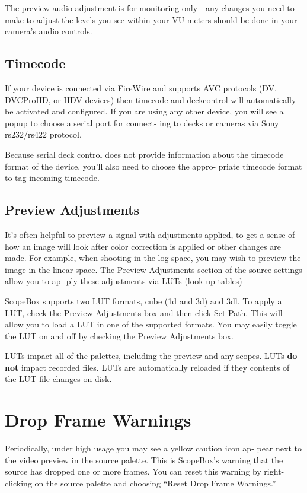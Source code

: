 \documentclass[10,letterpaper,]{report}
\begin{document}
The preview audio adjustment is for monitoring only - any changes you
need to make to adjust the levels you see within your VU meters should
be done in your camera's audio controls.

\subsection{Timecode}

If your device is connected via FireWire and supports AVC protocols (DV,
DVCProHD, or HDV devices) then timecode and deckcontrol will
automatically be activated and configured. If you are using any other
device, you will see a popup to choose a serial port for connect- ing to
decks or cameras via Sony rs232/rs422 protocol.

Because serial deck control does not provide information about the
timecode format of the device, you'll also need to choose the appro-
priate timecode format to tag incoming timecode.

\subsection{Preview Adjustments}

It's often helpful to preview a signal with adjustments applied, to get
a sense of how an image will look after color correction is applied or
other changes are made. For example, when shooting in the log space, you
may wish to preview the image in the linear space. The Preview
Adjustments section of the source settings allow you to ap- ply these
adjustments via LUTs (look up tables)

ScopeBox supports two LUT formats, cube (1d and 3d) and 3dl. To apply a
LUT, check the Preview Adjustments box and then click Set Path. This
will allow you to load a LUT in one of the supported formats. You may
easily toggle the LUT on and off by checking the Preview Adjustments
box.

LUTs impact all of the palettes, including the preview and any scopes.
LUTs \textbf{do not} impact recorded files. LUTs are automatically
reloaded if they contents of the LUT file changes on disk.

\section{Drop Frame Warnings}

Periodically, under high usage you may see a yellow caution icon ap-
pear next to the video preview in the source palette. This is ScopeBox's
warning that the source has dropped one or more frames. You can reset
this warning by right-clicking on the source palette and choosing
``Reset Drop Frame Warnings.''
\end{document}

